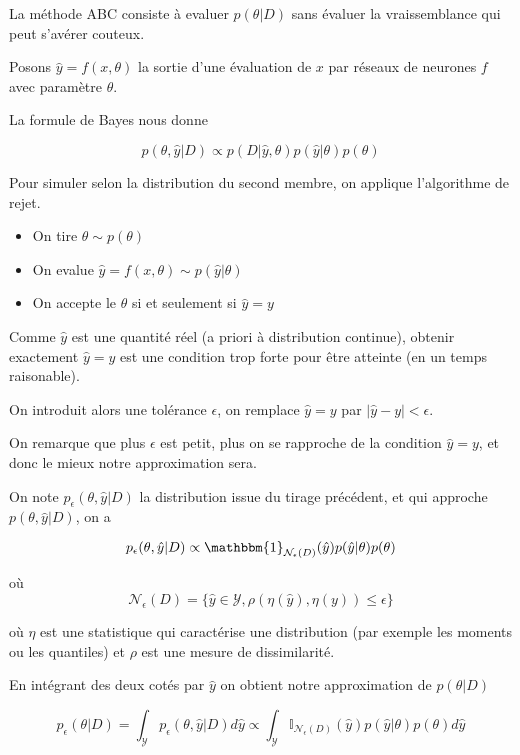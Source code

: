 \documentclass[french,12pt]{article}
\begin{document}
La méthode ABC consiste à evaluer $p(\theta | D)$ sans évaluer
la vraissemblance qui peut s'avérer couteux.

Posons $\hat{y} = f(x, \theta)$ la sortie d'une évaluation de $x$ par
réseaux de neurones $f$ avec paramètre $\theta$.

La formule de Bayes nous donne

$$ p(\theta, \hat{y} | D) \propto p(D | \hat{y}, \theta) p(\hat{y} | \theta)
    p(\theta)$$

Pour simuler selon la distribution du second membre, on applique
l'algorithme de rejet.

\begin{itemize}
    \item On tire $\theta \sim p(\theta)$
    \item On evalue $\hat{y} = f(x , \theta) \sim p(\hat{y} | \theta)$
    \item On accepte le $\theta$ si et seulement si $\hat{y} = y$
\end{itemize}

Comme $\hat{y}$ est une quantité réel (a priori à distribution continue),
obtenir exactement $\hat{y} = y$ est une condition trop forte
pour être atteinte (en un temps raisonable).

On introduit alors une tolérance $\epsilon$, on remplace $\hat{y} = y$
par $|\hat{y} - y| < \epsilon$.

On remarque que plus $\epsilon$ est petit, plus on se rapproche de la condition $\hat{y} = y$,
et donc le mieux notre approximation sera.

On note $p_{\epsilon} (\theta, \hat{y} | D)$ la distribution issue
du tirage précédent, et qui approche $p(\theta, \hat{y} |D)$, on a

$$p_{\epsilon} (\theta , \hat{y} | D) \propto \mathbbm{1}_{\mathcal{N}_{\epsilon}(D)} (\hat{y}) p(\hat{y} | \theta)
    p(\theta) $$

où $$\mathcal{N}_{\epsilon}(D) = \{\hat{y} \in \mathcal{Y}, \rho(\eta(\hat{y}), \eta(y)) \leq \epsilon\}$$


où $\eta$ est une statistique qui caractérise une distribution
(par exemple les moments ou les quantiles) et $\rho$ est une mesure de dissimilarité.

En intégrant des deux cotés par $\hat{y}$ on obtient notre approximation de $p(\theta | D)$

$$p_{\epsilon}( \theta | D) = \int_{\mathcal{Y}} p_{\epsilon}( \theta , \hat{y}| D) d \hat{y} \propto \int_{\mathcal{Y}} \mathbb{I}_{\mathcal{N}_\epsilon (D)} (\hat{y}) p( \hat{y}| \theta) p( \theta) d \hat{y}$$
\end{document}
